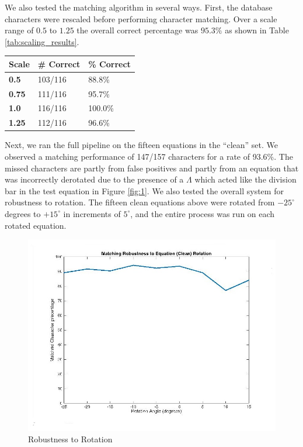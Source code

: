 \documentclass[journal]{IEEEtran}
\begin{document}
We also tested the matching algorithm in several ways. First, the database characters were rescaled before performing character matching. Over a scale range of $0.5$ to $1.25$ the overall correct percentage was $95.3\%$ as shown in Table \ref{tab:scaling_results}.

\begin{minipage}{\columnwidth}
     \label{tab:scaling_results} 
    \begin{tabularx}{\columnwidth}{|X|X|X|}
        \hline
        \textbf{Scale} & \textbf{\# Correct} & \textbf{\% Correct}\\
        \hline
        \hline
        \textbf{0.5} &	103/116 &	88.8\%\\
        \hline
        \textbf{0.75} &	111/116 &	95.7\%\\
        \hline
        \textbf{1.0}	 & 116/116 &	100.0\%\\
        \hline
        \textbf{1.25} &	112/116 &	96.6\%\\
        \hline
    \end{tabularx}    
\end{minipage}

Next, we ran the full pipeline on the fifteen equations in the “clean” set. We observed a matching performance of 147/157 characters for a rate of 93.6\%. The missed characters are partly from false positives and partly from an equation that was incorrectly derotated due to the presence of a $\Lambda$ which acted like the division bar in the test equation in Figure \ref{fig:1}.
We also tested the overall system for robustness to rotation. The fifteen clean equations above were rotated from $-25^\circ$ degrees to $+15^\circ$ in increments of $5^\circ$, and the entire process was run on each rotated equation.

\begin{figure}[!t]
    \centering
    \includegraphics[width=\columnwidth]{rotation_robust}
    \caption{Robustness to Rotation}
    \label{fig:rotation_robust}
\end{figure}
\end{document}
